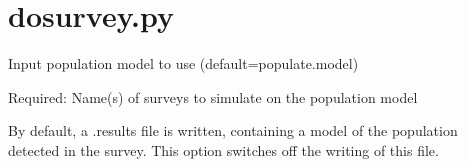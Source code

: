 \documentclass[letterpaper,10pt,english]{sphinxmanual}
\begin{document}
\section{dosurvey.py}
\label{\detokenize{cmd-line-docs:dosurvey-py}}\label{\detokenize{cmd-line-docs:dosurvey-docs}}

\begin{fulllineitems}
\label{\detokenize{cmd-line-docs:cmdoption-dosurvey.py-f}}
\pysigstartsignatures
\pysigline
{}
\pysigstopsignatures
\sphinxAtStartPar
Input population model to use (default=populate.model)

\end{fulllineitems}


\begin{fulllineitems}
\label{\detokenize{cmd-line-docs:cmdoption-dosurvey.py-surveys}}
\pysigstartsignatures
\pysigline
{}
\pysigstopsignatures
\sphinxAtStartPar
Required: Name(s) of surveys to simulate on the population model

\end{fulllineitems}


\begin{fulllineitems}
\label{\detokenize{cmd-line-docs:cmdoption-dosurvey.py-noresults}}
\pysigstartsignatures
\pysigline
{\sphinxcode{\sphinxupquote{}}}
\pysigstopsignatures
\sphinxAtStartPar
By default, a .results file is written, containing a model of the population
detected in the survey. This option switches off the writing of this file.

\end{fulllineitems}
\end{document}
